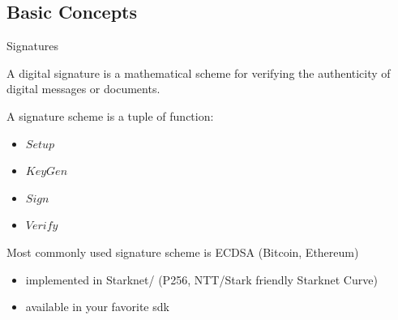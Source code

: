 \documentclass[aspectratio=43]{beamer}
\begin{document}
    \subsection{Basic Concepts}
    \begin{frame}{Signatures}
     
     A digital signature is a mathematical scheme for verifying the authenticity of digital messages or documents.
     
     \begin{definition}
     A signature scheme is a tuple of function:
     \begin{itemize}
     \item $Setup$
     \item $KeyGen$
     \item $Sign$
     \item $Verify$
     \end{itemize}
     
     \end{definition}
     Most commonly used signature scheme is ECDSA (Bitcoin, Ethereum)
     \begin{itemize}
     \item implemented in Starknet/\href{https://github.com/starkware-libs/cairo-lang/tree/master/src/starkware/cairo/common}{} (P256, NTT/Stark friendly Starknet Curve)
     \item available in your favorite sdk
     \href{https://developers.ledger.com/docs/nano-app/crypto-api/ox__ec_8h/}{}
     
     \end{itemize} 
    
\end{frame}
\end{document}
